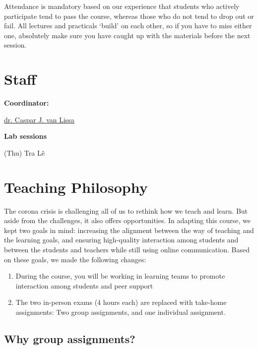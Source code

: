 \documentclass[
  letterpaper,
]{scrbook}
\providecommand{\tightlist}{%
  \setlength{\itemsep}{0pt}\setlength{\parskip}{0pt}}\usepackage{longtable,booktabs,array}
\begin{document}

Attendance is mandatory based on our experience that students who
actively participate tend to pass the course, whereas those who do not
tend to drop out or fail. All lectures and practicals `build' on each
other, so if you have to miss either one, absolutely make sure you have
caught up with the materials before the next session.

\hypertarget{staff}{%
\section*{Staff}\label{staff}}


\textbf{Coordinator:}

\href{https://www.tilburguniversity.edu/nl/medewerkers/c-j-vanlissa}{dr.
Caspar J. van Lissa}

\textbf{Lab sessions}

(Thu) Tra Lê

\hypertarget{teaching-philosophy}{%
\section*{Teaching Philosophy}\label{teaching-philosophy}}


The corona crisis is challenging all of us to rethink how we teach and
learn. But aside from the challenges, it also offers opportunities. In
adapting this course, we kept two goals in mind: increasing the
alignment between the way of teaching and the learning goals, and
ensuring high-quality interaction among students and between the
students and teachers while still using online communication. Based on
these goals, we made the following changes:

\begin{enumerate}
\def\labelenumi{\arabic{enumi}.}
\tightlist
\item
  During the course, you will be working in learning teams to promote
  interaction among students and peer support
\item
  The two in-person exams (4 hours each) are replaced with take-home
  assignments: Two group assignments, and one individual assignment.
\end{enumerate}

\hypertarget{why-group-assignments}{%
\subsection*{Why group assignments?}\label{why-group-assignments}}
\end{document}
